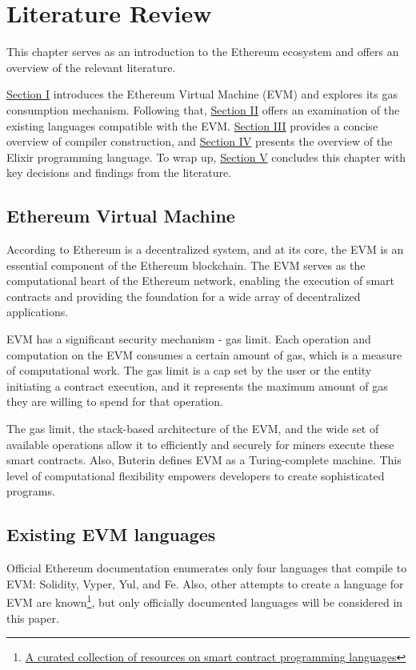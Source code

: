 \chapter{Literature Review}
\label{chap:lr}

This chapter serves as an introduction to the Ethereum ecosystem and offers an overview of the relevant literature.

\hyperref[sec:evm]{Section I} introduces the Ethereum Virtual Machine (EVM) and explores its gas consumption mechanism. Following that, \hyperref[sec:langs]{Section II} offers an examination of the existing languages compatible with the EVM. \hyperref[sec:cc]{Section III} provides a concise overview of compiler construction, and \hyperref[sec:ex]{Section IV} presents the overview of the Elixir programming language. To wrap up, \hyperref[sec:conc]{Section V} concludes this chapter with key decisions and findings from the literature.

\section{Ethereum Virtual Machine}
\label{sec:evm}
According to \cite{EthereumWhitepaper} Ethereum is a decentralized system, and at its core, the EVM is an essential component of the Ethereum blockchain. The EVM serves as the computational heart of the Ethereum network, enabling the execution of smart contracts and providing the foundation for a wide array of decentralized applications.

EVM has a significant security mechanism - gas limit. Each operation and computation on the EVM consumes a certain amount of gas, which is a measure of computational work. The gas limit is a cap set by the user or the entity initiating a contract execution, and it represents the maximum amount of gas they are willing to spend for that operation.

The gas limit, the stack-based architecture of the EVM, and the wide set of available operations allow it to efficiently and securely for miners execute these smart contracts. Also, Buterin \cite{EthereumWhitepaper} defines EVM as a Turing-complete machine. This level of computational flexibility empowers developers to create sophisticated programs.

\section{Existing EVM languages}
\label{sec:langs} 
Official Ethereum documentation \cite{OfficialEthereumLanguages} enumerates only four languages that compile to EVM: Solidity, Vyper, Yul, and Fe. Also, other attempts to create a language for EVM are known\footnote{\href{https://github.com/s-tikhomirov/smart-contract-languages}{A curated collection of resources on smart contract programming languages}}, but only officially documented languages will be considered in this paper.

